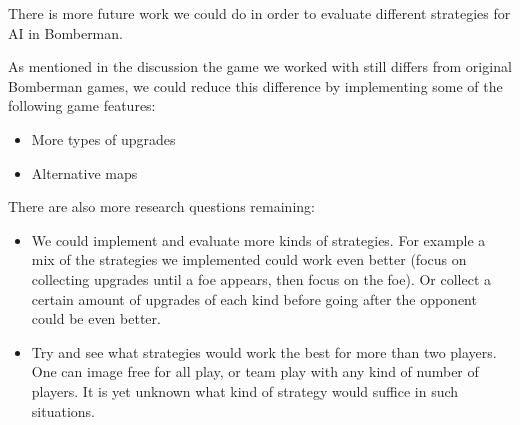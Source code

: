 %
There is more future work we could do in order to evaluate different
strategies for AI in Bomberman.

As mentioned in the discussion the game we worked with still differs
from original Bomberman games, we could reduce this difference by
implementing some of the following game features:
\begin{itemize}
\item More types of upgrades
\item Alternative maps
\end{itemize}

There are also more research questions remaining:
\begin{itemize}
\item We could implement and evaluate more kinds of strategies. For example
a mix of the strategies we implemented could work even better
(focus on collecting upgrades until a foe appears, then focus on the foe). Or
collect a certain amount of upgrades of each kind before going after the opponent
could be even better.
\item Try and see what strategies would work the best for more than two
players. One can image free for all play, or team play with any kind of number
of players. It is yet unknown what kind of strategy would suffice in such
situations.
\end{itemize}
